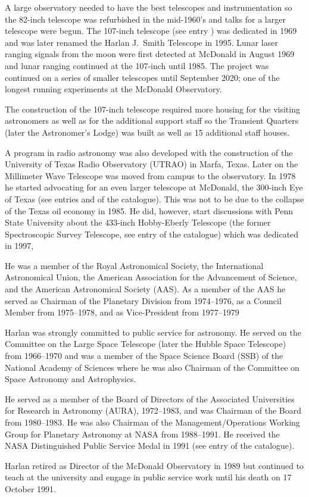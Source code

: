 A large observatory needed to have the best telescopes and
instrumentation so the 82-inch telescope was refurbished in the
mid-1960's and talks for a larger telescope were begun.  The 107-inch
telescope (see entry ) was dedicated in 1969 and was later
renamed the Harlan J.~Smith Telescope in 1995. Lunar laser ranging
signals from the moon were first detected at McDonald in August 1969 and
lunar ranging continued at the 107-inch until 1985. The project was
continued on a series of smaller telescopes until September 2020; one
of the longest running experiments at the McDonald Observatory.

The construction of the 107-inch telescope required more housing for the
visiting astronomers as well as for the additional support staff
so the Transient Quarters (later the Astronomer's Lodge) was
built as well as 15 additional staff houses.

A program in radio astronomy was also developed with the construction
of the University of Texas Radio Observatory (UTRAO) in Marfa,
Texas. Later on the Millimeter Wave Telescope was moved from campus to
the observatory. In 1978 he started advocating for an even larger
telescope at McDonald, the 300-inch Eye of Texas (see
entries  and  of the catalogue). This was not to
be due to the collapse of the Texas oil economy in 1985. He did,
however, start discussions with Penn State University about the
433-inch Hobby-Eberly Telescope (the former Spectroscopic Survey
Telescope, see entry  of the catalogue) which was dedicated
in 1997,

He was a member of the Royal Astronomical Society, the International
Astronomical Union, the American Association for the Advancement of
Science, and the American Astronomical Society (AAS). As a member of
the AAS he served as Chairman of the Planetary Division from
1974--1976, as a Council Member from 1975--1978, and as Vice-President
from 1977--1979

Harlan was strongly committed to public service for astronomy. He
served on the Committee on the Large Space Telescope
(later the Hubble Space Telescope) from 1966--1970 and was a member of the
Space Science Board (SSB) of the National Academy of Sciences where he
was also Chairman of the Committee on Space Astronomy and
Astrophysics.

He served as a member of the Board of Directors of the Associated
Universities for Research in Astronomy (AURA), 1972--1983, and was
Chairman of the Board from 1980--1983. He was also Chairman of the
Management/Operations Working Group for Planetary Astronomy at NASA
from 1988--1991.  He received the NASA Distinguished Public Service
Medal in 1991 (see entry  of the catalogue).

Harlan retired as Director of the McDonald Observatory in 1989  but
continued to teach at the university and engage in public service work
until his death on 17 October 1991.


